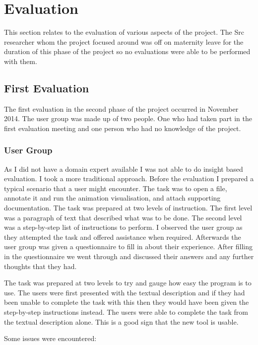 \chapter{Evaluation}
\label{chap:eval}

This section relates to the evaluation of various aspects of the project.  The Src researcher whom the project focused around was off on maternity leave for the duration of this phase of the project so no evaluations were able to be performed with them.

\section{First Evaluation}

The first evaluation in the second phase of the project occurred in November 2014.  The user group was made up of two people.  One who had taken part in the first evaluation meeting and one person who had no knowledge of the project.

\subsection{User Group}

As I did not have a domain expert available I was not able to do insight based evaluation.  I took a more traditional approach.  Before the evaluation I prepared a typical scenario that a user might encounter.  The task was to open a file, annotate it and run the animation visualisation, and attach supporting documentation.  The task was prepared at two levels of instruction.  The first level was a paragraph of text that described what was to be done.  The second level was a step-by-step list of instructions to perform.  I observed the user group as they attempted the task and offered assistance when required.  Afterwards the user group was given a questionnaire to fill in about their experience. After filling in the questionnaire we went through and discussed their answers and any further thoughts that they had.

The task was prepared at two levels to try and gauge how easy the program is to use.  The users were first presented with the textual description and if they had been unable to complete the task with this then they would have been given the step-by-step instructions instead.  The users were able to complete the task from the textual description alone.  This is a good sign that the new tool is usable.

Some issues were encountered:

